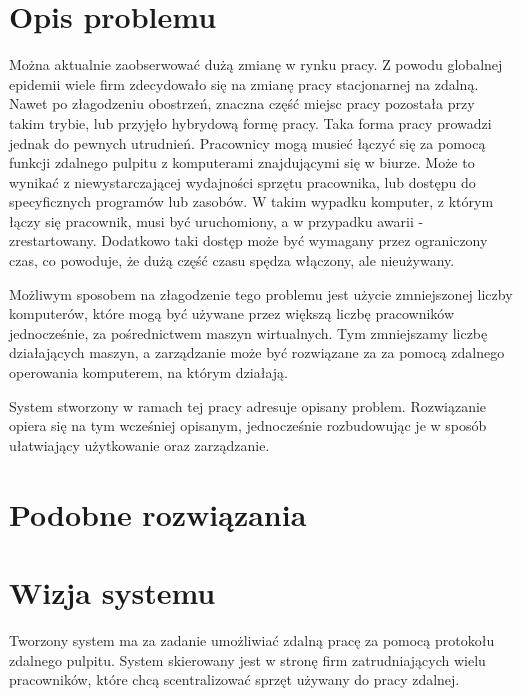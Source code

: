\documentclass[../praca-dyplomowa.tex]{subfiles}
\begin{document}
\section{Opis problemu}


Można aktualnie zaobserwować dużą zmianę w rynku pracy. Z powodu globalnej epidemii wiele firm zdecydowało się na zmianę pracy stacjonarnej na zdalną. Nawet po złagodzeniu obostrzeń, znaczna część miejsc pracy pozostała przy takim trybie, lub przyjęło hybrydową formę pracy. Taka forma pracy prowadzi jednak do pewnych utrudnień. Pracownicy mogą musieć łączyć się za pomocą funkcji zdalnego pulpitu z komputerami znajdującymi się w biurze. Może to wynikać z niewystarczającej wydajności sprzętu pracownika, lub dostępu do specyficznych programów lub zasobów. W takim wypadku komputer, z którym łączy się pracownik, musi być uruchomiony, a w przypadku awarii - zrestartowany. Dodatkowo taki dostęp może być wymagany przez ograniczony czas, co powoduje, że dużą część czasu spędza włączony, ale nieużywany.

Możliwym sposobem na złagodzenie tego problemu jest użycie zmniejszonej liczby komputerów, które mogą być używane przez większą liczbę pracowników jednocześnie, za pośrednictwem maszyn wirtualnych. Tym zmniejszamy liczbę działających maszyn, a zarządzanie może być rozwiązane za za pomocą zdalnego operowania komputerem, na którym działają.

System stworzony w ramach tej pracy adresuje opisany problem. Rozwiązanie opiera się na tym wcześniej opisanym, jednocześnie rozbudowując je w sposób ułatwiający użytkowanie oraz zarządzanie.

\section{Podobne rozwiązania}


\section{Wizja systemu}

Tworzony system ma za zadanie umożliwiać zdalną pracę za pomocą protokołu zdalnego pulpitu. System skierowany jest w stronę firm zatrudniających wielu pracowników, które chcą scentralizować sprzęt używany do pracy zdalnej.
\end{document}
